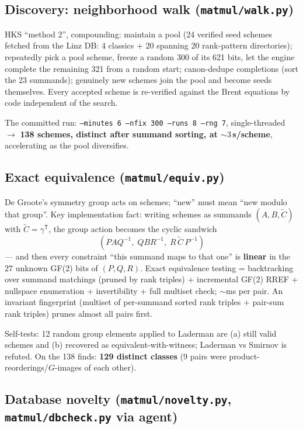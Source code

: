 \documentclass[10pt]{article}
\newcommand{\Ct}{\ensuremath{\tilde{C}}}
\begin{document}
\subsection{Discovery: neighborhood walk
(\texttt{matmul/walk.py})}\label{sec:walk}

HKS ``method 2'', compounding: maintain a pool (24 verified seed
schemes fetched from the Linz DB: 4 classics + 20 spanning 20
rank-pattern directories); repeatedly pick a pool scheme, freeze a
random 300 of its 621 bits, let the engine complete the remaining 321
from a random start; canon-dedupe completions (sort the 23 summands);
genuinely new schemes join the pool and become seeds themselves. Every
accepted scheme is re-verified against the Brent equations by code
independent of the search.

The committed run: \texttt{--minutes 6 --nfix 300 --runs 8 --rng 7},
single-threaded $\rightarrow$ \textbf{138 schemes, distinct after
summand sorting, at ${\sim}3$\,s/scheme}, accelerating as the pool
diversifies.

\subsection{Exact equivalence (\texttt{matmul/equiv.py})}\label{sec:equiv}

De Groote's symmetry group acts on schemes; ``new'' must mean ``new
modulo that group''. Key implementation fact: writing schemes as
summands $(A, B, \Ct)$ with $\Ct = \gamma^{\mathsf T}$, the group
action becomes the cyclic sandwich
\[
(P A Q^{-1},\; Q B R^{-1},\; R\,\Ct\,P^{-1})
\]
--- and then every constraint ``this summand maps to that one'' is
\textbf{linear} in the 27 unknown GF(2) bits of $(P,Q,R)$. Exact
equivalence testing = backtracking over summand matchings (pruned by
rank triples) + incremental GF(2) RREF + nullspace enumeration +
invertibility + full multiset check; ${\sim}$ms per pair. An invariant
fingerprint (multiset of per-summand sorted rank triples + pair-sum
rank triples) prunes almost all pairs first.

Self-tests: 12 random group elements applied to Laderman are (a) still
valid schemes and (b) recovered as equivalent-with-witness; Laderman
vs Smirnov is refuted. On the 138 finds: \textbf{129 distinct classes}
(9 pairs were product-reorderings/$G$-images of each other).

\subsection{Database novelty (\texttt{matmul/novelty.py},
\texttt{matmul/dbcheck.py} via agent)}\label{sec:novelty}
\end{document}
